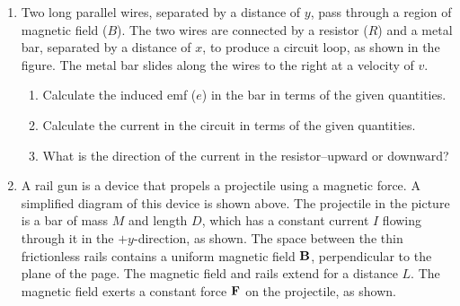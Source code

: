 \documentclass{../../../oss-classkick}
\begin{document}
\begin{enumerate}[leftmargin=15pt]
  \begin{center}
  \end{center}
\item Two long parallel wires, separated by a distance of $y$, pass through a
  region of magnetic field ($B$). The two wires are connected by a resistor
  ($R$) and a metal bar, separated by a distance of $x$, to produce a circuit
  loop, as shown in the figure. The metal bar slides along the wires to
  the right at a velocity of $v$.
  \begin{enumerate}
  \item Calculate the induced emf ($e$) in the bar in terms of the given
    quantities.
  \item Calculate the current in the circuit in terms of the given quantities.
  \item What is the direction of the current in the resistor--upward or
    downward?
  \end{enumerate}
  \newpage

  \begin{center}
  \end{center}
\item A rail gun is a device that propels a projectile using a magnetic force.
  A simplified diagram of this device is shown above. The projectile in the
  picture is a bar of mass $M$ and length $D$, which has a constant current $I$
  flowing through it in the $+y$-direction, as shown. The space between the
  thin frictionless rails contains a uniform magnetic field $\mathbf{B}$,
  perpendicular to the plane of the page. The magnetic field and rails extend
  for a distance $L$. The magnetic field exerts a constant force $\mathbf{F}$ on
  the projectile, as shown.


\end{enumerate}
\end{document}
